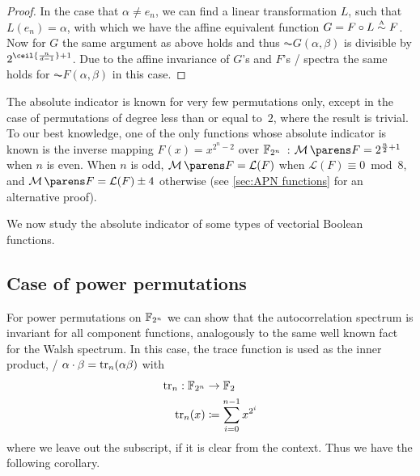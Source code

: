 \begin{proof}
    In the case that $\alpha \neq e_n$, we can find a linear transformation $L$, such that $L(e_n) = \alpha$, with which we have the affine equivalent function $G = F \circ L \stackrel{\text{\tiny A}}{\sim} F$.
    Now for $G$ the same argument as above holds and thus $\AC{G}(\alpha, \beta)$ is divisible by $2^{\ceil{\frac{n}{d-1}}+1}$.
    Due to the affine invariance of $G$'s and $F$'s \ACT/ spectra the same holds for $\AC{F}(\alpha, \beta)$ in this case.
\end{proof}
The absolute indicator is known for very few permutations only, except in the case of permutations of degree less than or equal to~$2$, where the result is trivial.
To our best knowledge, one of the only functions whose absolute indicator is known is the inverse mapping $F(x)=x^{2^n-2}$ over $\mathbb{F}_{2^n}$~\cite{FF:ChaHelZin07}: $\absoluteindicator{F} = 2^{\frac{n}{2}+1}$ when $n$ is even.
When $n$ is odd, $\absoluteindicator{F}=\mathcal{L}(F)$ when $\mathcal{L}(F) \equiv 0 \bmod{8}$, and $\absoluteindicator{F}=\mathcal{L}(F) \pm 4$ otherwise (see \cref{sec:APN functions} for an alternative proof).

We now study the absolute indicator of some types of vectorial Boolean functions.

\subsection{Case of power permutations}
For power permutations on $\mathbb{F}_{2^n}$ we can show that the autocorrelation spectrum is invariant for all component functions, analogously to the same well known fact for the Walsh spectrum.
In this case, the trace function is used as the inner product, \ie/ $\alpha \cdot \beta = \operatorname{tr}_n(\alpha \beta)$ with
\begin{align*}
    \operatorname{tr}_n : \mathbb{F}_{2^n} &\to \mathbb{F}_2 \\
    \operatorname{tr}_n(x) &\coloneqq \sum_{i=0}^{n-1} x^{2^i}
\end{align*}
where we leave out the subscript, if it is clear from the context.
Thus we have the following corollary.

